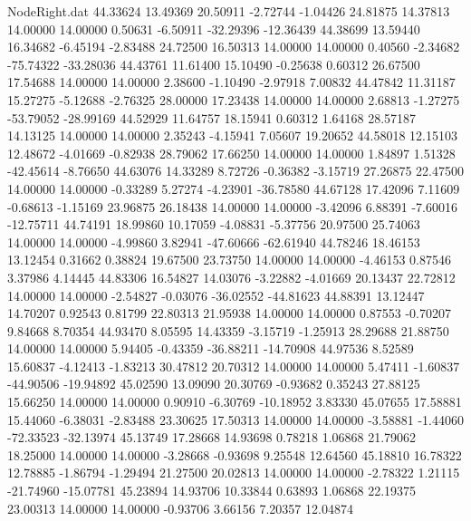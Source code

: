 \begin{filecontents}{NodeRight.dat}
  44.33624   13.49369   20.50911    -2.72744   -1.04426   24.81875   14.37813   14.00000   14.00000    0.50631   -6.50911  -32.29396  -12.36439
  44.38699   13.59440   16.34682    -6.45194   -2.83488   24.72500   16.50313   14.00000   14.00000    0.40560   -2.34682  -75.74322  -33.28036
  44.43761   11.61400   15.10490    -0.25638    0.60312   26.67500   17.54688   14.00000   14.00000    2.38600   -1.10490   -2.97918    7.00832
  44.47842   11.31187   15.27275    -5.12688   -2.76325   28.00000   17.23438   14.00000   14.00000    2.68813   -1.27275  -53.79052  -28.99169
  44.52929   11.64757   18.15941     0.60312    1.64168   28.57187   14.13125   14.00000   14.00000    2.35243   -4.15941    7.05607   19.20652
  44.58018   12.15103   12.48672    -4.01669   -0.82938   28.79062   17.66250   14.00000   14.00000    1.84897    1.51328  -42.45614   -8.76650
  44.63076   14.33289    8.72726    -0.36382   -3.15719   27.26875   22.47500   14.00000   14.00000   -0.33289    5.27274   -4.23901  -36.78580
  44.67128   17.42096    7.11609    -0.68613   -1.15169   23.96875   26.18438   14.00000   14.00000   -3.42096    6.88391   -7.60016  -12.75711
  44.74191   18.99860   10.17059    -4.08831   -5.37756   20.97500   25.74063   14.00000   14.00000   -4.99860    3.82941  -47.60666  -62.61940
  44.78246   18.46153   13.12454     0.31662    0.38824   19.67500   23.73750   14.00000   14.00000   -4.46153    0.87546    3.37986    4.14445
  44.83306   16.54827   14.03076    -3.22882   -4.01669   20.13437   22.72812   14.00000   14.00000   -2.54827   -0.03076  -36.02552  -44.81623
  44.88391   13.12447   14.70207     0.92543    0.81799   22.80313   21.95938   14.00000   14.00000    0.87553   -0.70207    9.84668    8.70354
  44.93470    8.05595   14.43359    -3.15719   -1.25913   28.29688   21.88750   14.00000   14.00000    5.94405   -0.43359  -36.88211  -14.70908
  44.97536    8.52589   15.60837    -4.12413   -1.83213   30.47812   20.70312   14.00000   14.00000    5.47411   -1.60837  -44.90506  -19.94892
  45.02590   13.09090   20.30769    -0.93682    0.35243   27.88125   15.66250   14.00000   14.00000    0.90910   -6.30769  -10.18952    3.83330
  45.07655   17.58881   15.44060    -6.38031   -2.83488   23.30625   17.50313   14.00000   14.00000   -3.58881   -1.44060  -72.33523  -32.13974
  45.13749   17.28668   14.93698     0.78218    1.06868   21.79062   18.25000   14.00000   14.00000   -3.28668   -0.93698    9.25548   12.64560
  45.18810   16.78322   12.78885    -1.86794   -1.29494   21.27500   20.02813   14.00000   14.00000   -2.78322    1.21115  -21.74960  -15.07781
  45.23894   14.93706   10.33844     0.63893    1.06868   22.19375   23.00313   14.00000   14.00000   -0.93706    3.66156    7.20357   12.04874

\end{filecontents}
